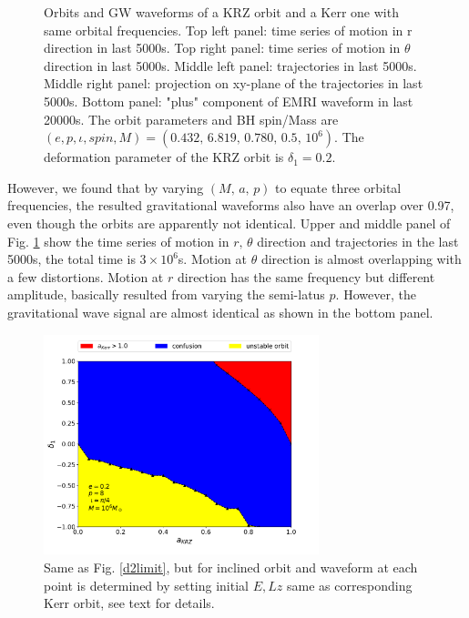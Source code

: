 \documentclass{article}
\begin{document}
\begin{figure}[!ht]
	\caption{Orbits and GW waveforms of a KRZ orbit and a Kerr one with same orbital frequencies. Top left panel: time series of motion in r direction in last 5000s. Top right panel: time series of motion in $\theta$ direction in last 5000s. Middle left panel: trajectories in last 5000s. Middle right panel: projection on xy-plane of the trajectories in last 5000s. Bottom panel: "plus" component of EMRI waveform in last 20000s. The orbit parameters and BH spin/Mass are $(e,p,\iota,spin,M)=(0.432,\, 6.819,\, 0.780,\, 0.5,\, 10^6)$. The deformation parameter of the KRZ orbit is $\delta_1=0.2$.}
	\label{3dtraj}
\end{figure}

However, we found that by varying $(M,\, a,\, p)$ to equate three orbital frequencies, the resulted gravitational waveforms also have an overlap over 0.97, even though the orbits are apparently not identical. Upper and middle panel of Fig. \ref{3dtraj} show the time series of motion in $r,\, \theta $ direction and trajectories in the last 5000s, the total time is $3\times 10^6$s. Motion at $\theta$ direction is almost overlapping with a few distortions. Motion at $r$ direction has the same frequency but different amplitude, basically resulted from varying the semi-latus $p$. However, the gravitational wave signal are almost identical as shown in the bottom panel. 

\begin{figure}[!ht]
	\centering
	\includegraphics[width=8cm]{3D_bound.pdf}
	
	\caption{Same as Fig. \ref{d2limit}, but for inclined orbit and waveform at each point is determined by setting initial $E,Lz$ same as corresponding Kerr orbit, see text for details.}
	\label{3dlimit}
\end{figure}
\end{document}
